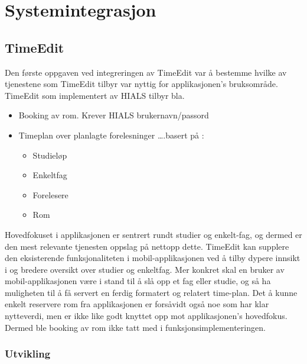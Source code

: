 \documentclass[../main.tex]{subfiles}
\begin{document}
\section{Systemintegrasjon}

\subsection{TimeEdit}

Den første oppgaven ved integreringen av TimeEdit var å bestemme hvilke av tjenestene som TimeEdit tilbyr var nyttig for applikasjonen’s bruksområde. TimeEdit som implementert av HIALS tilbyr bla. 

\begin{itemize}
\item Booking av rom.  \newline
Krever HIALS brukernavn/passord
\item Timeplan over planlagte forelesninger  \newline
 ….basert på :
\begin{itemize}
\item Studieløp
\item Enkeltfag
\item Forelesere
\item Rom
\end{itemize}
\end{itemize}

Hovedfokuset i applikasjonen er sentrert rundt studier og enkelt-fag, og dermed er den mest relevante tjenesten oppslag på nettopp dette. TimeEdit kan supplere den eksisterende funksjonaliteten i mobil-applikasjonen ved å tilby dypere innsikt i og bredere oversikt over studier og enkeltfag. Mer konkret skal en bruker av mobil-applikasjonen være i stand til å slå opp et fag eller studie, og så ha muligheten til å få servert en ferdig formatert og relatert time-plan.
Det å kunne enkelt reservere rom fra applikasjonen er forsåvidt også noe som har klar nytteverdi, men er ikke like godt knyttet opp mot applikasjonen’s hovedfokus. Dermed ble booking av rom ikke tatt med i funksjonsimplementeringen.

\subsubsection{Utvikling}
\end{document}

